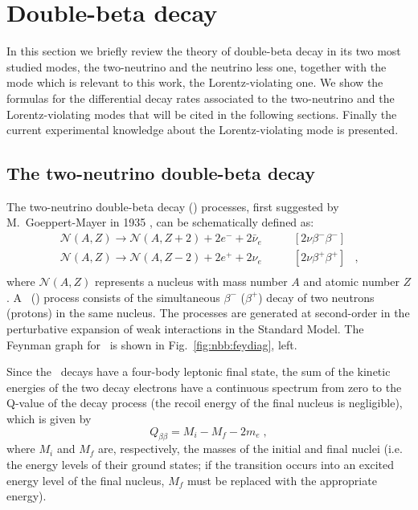\chapter{Double-beta decay}\label{chap:theory}

In this section we briefly review the theory of double-beta decay in its two
most studied modes, the two-neutrino and the neutrino less one, together with
the mode which is relevant to this work, the Lorentz-violating one. We show the
formulas for the differential decay rates associated to the two-neutrino and
the Lorentz-violating modes that will be cited in the following sections.
Finally the current experimental knowledge about the Lorentz-violating mode is
presented.

\section{The two-neutrino double-beta decay}
The two-neutrino double-beta decay (\nnbb) processes, first suggested by
M.~Goeppert-Mayer in 1935 \cite{GoeppertMayer1935}, can be schematically defined
as:
\[
  \begin{array}{lrl}
    \mathcal{N}(A,Z)\longrightarrow \mathcal{N}(A,Z+2)+2e^-+2\bar{\nu}_e &
      \qquad [2\nu\beta^-\beta^-] & \\
    \mathcal{N}(A,Z)\longrightarrow \mathcal{N}(A,Z-2)+2e^++2\nu_e &
      \qquad [2\nu\beta^+\beta^+] & ,\\
  \end{array}
\]
where $\mathcal{N}(A,Z)$ represents a nucleus with mass number $A$ and atomic
number $Z$. A \nnbbm\ (\nnbbp) process consists of
the simultaneous $\beta^-$ ($\beta^+$) decay of two neutrons (protons) in the
same nucleus. The processes are generated at second-order in the perturbative
expansion of weak interactions in the Standard Model. The Feynman graph for
\nnbbm\ is shown in Fig.~\cref{fig:nbb:feydiag}, left.

Since the \nnbb\ decays have a four-body leptonic final state, the sum of the
kinetic energies of the two decay electrons have a continuous spectrum from
zero to the Q-value of the decay process (the recoil energy of the final
nucleus is negligible), which is given by
\begin{equation}
  Q_{\beta\beta} = M_i - M_f - 2m_e \;,
\end{equation}
where $M_i$ and $M_f$ are, respectively, the masses of the initial and final
nuclei (i.e. the energy levels of their ground states; if the transition occurs
into an excited energy level of the final nucleus, $M_f$ must be replaced with
the appropriate energy).

